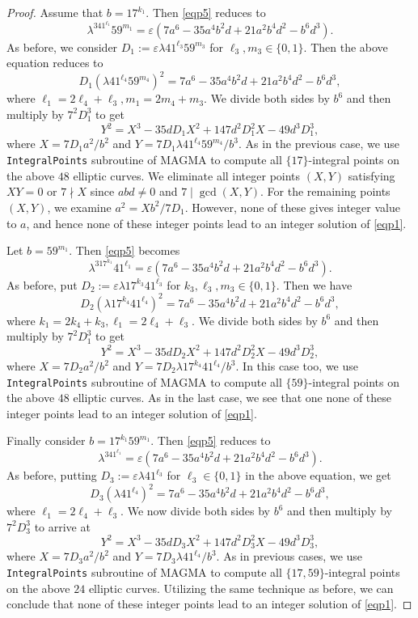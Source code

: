 \documentclass[12pt, 14paper,reqno]{amsart}
\theoremstyle{plain}
\theoremstyle{proof}
\numberwithin{equation}{section}
\begin{document}
\begin{proof}
Assume that $b=17^{k_1}$. Then \eqref{eqp5} reduces to
$$\lambda^341^{\ell_1}59^{m_1}=\varepsilon (7a^6-35a^4b^2d+21a^2b^4d^2-b^6d^3).$$
As before, we consider $D_1:=\varepsilon\lambda 41^{\ell_3}59^{m_3}$ for $ \ell_3, m_3\in\{0, 1\}$. Then the above equation reduces to
$$D_1(\lambda 41^{\ell_4}59^{m_4})^2=7a^6-35a^4b^2d+21a^2b^4d^2-b^6d^3,$$
 where $\ell_1=2\ell_4+\ell_3, m_1=2m_4+m_3$.
We divide both sides by $b^6$ and then multiply by $7^2D_1^3$ to get
$$Y^2=X^3-35dD_1X^2+147d^2D_1^2X-49d^3D_1^3,$$
where $X=7D_1a^2/b^2$ and $Y=7D_1\lambda 41^{\ell_4}59^{m_4}/b^3$.
As in the previous case, we use \texttt{IntegralPoints} subroutine of MAGMA to compute all $\{17\}$-integral points on the above $48$ elliptic curves. We eliminate all integer points $(X,Y)$ satisfying $XY=0$ or $7\nmid X$ since $abd\ne0$ and $7\mid \gcd(X,Y)$. For the remaining points $(X,Y)$, we examine $a^2=Xb^2/{7D_1}$. However, none of these gives integer value to $a$, and hence none of these integer points lead to an integer solution of \eqref{eqp1}. 

Let $b=59^{m_1}$. Then \eqref{eqp5} becomes
$$\lambda^317^{k_1}41^{\ell_1}=\varepsilon (7a^6-35a^4b^2d+21a^2b^4d^2-b^6d^3).$$
As before, put $D_2:=\varepsilon\lambda 17^{k_3}41^{\ell_3}$ for $k_3, \ell_3, m_3\in\{0, 1\}$. Then we have
$$D_2(\lambda 17^{k_4}41^{\ell_4})^2=7a^6-35a^4b^2d+21a^2b^4d^2-b^6d^3,$$
 where $k_1=2k_4+k_3, \ell_1=2\ell_4+\ell_3$.
We divide both sides by $b^6$ and then multiply by $7^2D_1^3$ to get
$$Y^2=X^3-35dD_2X^2+147d^2D_2^2X-49d^3D_2^3,$$
where $X=7D_2a^2/b^2$ and $Y=7D_2\lambda 17^{k_4}41^{\ell_4}/b^3$.
In this case too, we use \texttt{IntegralPoints} subroutine of MAGMA to compute all $\{59\}$-integral points on the above $48$ elliptic curves.  As in the last case, we see that one  none of these integer points lead to an integer solution of \eqref{eqp1}. 


Finally consider $b=17^{k_1}59^{m_1}$. Then \eqref{eqp5} reduces to
$$\lambda^341^{\ell_1}=\varepsilon (7a^6-35a^4b^2d+21a^2b^4d^2-b^6d^3).$$
As before, putting $D_3:=\varepsilon\lambda 41^{\ell_3}$ for $\ell_3\in\{0, 1\}$ in the above equation, we get 
$$D_3(\lambda 41^{\ell_4})^2=7a^6-35a^4b^2d+21a^2b^4d^2-b^6d^3,$$
 where $\ell_1=2\ell_4+\ell_3$.
We now divide both sides by $b^6$ and then multiply by $7^2D_3^3$ to arrive at 
$$Y^2=X^3-35dD_3X^2+147d^2D_3^2X-49d^3D_3^3,$$
where $X=7D_3a^2/b^2$ and $Y=7D_3\lambda 41^{\ell_4}/b^3$.
As in previous cases, we use \texttt{IntegralPoints} subroutine of MAGMA to compute all $\{17,59\}$-integral points on the above $24$ elliptic curves. Utilizing the same technique as before, we can conclude that none of these integer points lead to an integer solution of \eqref{eqp1}. 


\end{proof}
\end{document}
